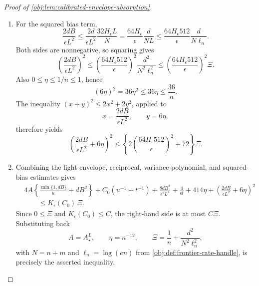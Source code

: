 \begin{proof}[Proof of \cref{obj:lem:calibrated-envelope-absorption}]
\begin{enumerate}
\item For the squared bias term,
\[
\frac{2dB}{\epsilon L^2}
\le
\frac{2d}{\epsilon L^2}\frac{32H_\epsilon L}{N}
=
\frac{64H_\epsilon}{\epsilon}\frac{d}{NL}
\le
\frac{64H_\epsilon512}{\epsilon}\frac{d}{N\ell_n}.
\]
Both sides are nonnegative, so squaring gives
\[
\left(\frac{2dB}{\epsilon L^2}\right)^2
\le
\left(\frac{64H_\epsilon512}{\epsilon}\right)^2
\frac{d^2}{N^2\ell_n^2}
\le
\left(\frac{64H_\epsilon512}{\epsilon}\right)^2\Xi .
\]
Also \(0\le\eta\le1/n\le1\), hence
\[
(6\eta)^2=36\eta^2\le36\eta\le\frac{36}{n}.
\]
The inequality \((x+y)^2\le2x^2+2y^2\), applied to
\[
x=\frac{2dB}{\epsilon L^2},
\qquad
y=6\eta,
\]
therefore yields
\[
\left(\frac{2dB}{\epsilon L^2}+6\eta\right)^2
\le
\left\{
2\left(\frac{64H_\epsilon512}{\epsilon}\right)^2+72
\right\}\Xi .
\]

\item Combining the light-envelope, reciprocal, variance-polynomial, and squared-bias estimates gives
\[
\begin{aligned}
&4A\left\{\frac{\min\{1,dB\}}u+dB^2\right\}
+C_0(u^{-1}+t^{-1})
+\frac{8dB^2}{\epsilon^2L^4}
+\frac4{\epsilon t}
+414\eta
+\left(\frac{2dB}{\epsilon L^2}+6\eta\right)^2  \\
&\qquad\le
K_\epsilon(C_0)\,\Xi .
\end{aligned}
\]
Since \(0\le\Xi\) and \(K_\epsilon(C_0)\le C\), the right-hand side is at most \(C\Xi\). Substituting back
\[
A=A_\star^L,\qquad \eta=n^{-12},\qquad
\Xi=\frac1n+\frac{d^2}{N^2\ell_n^2},
\]
with \(N=n+m\) and \(\ell_n=\log(en)\) from \cref{obj:def:frontier-rate-handle}, is precisely the asserted inequality. %
\end{enumerate}
\end{proof}

